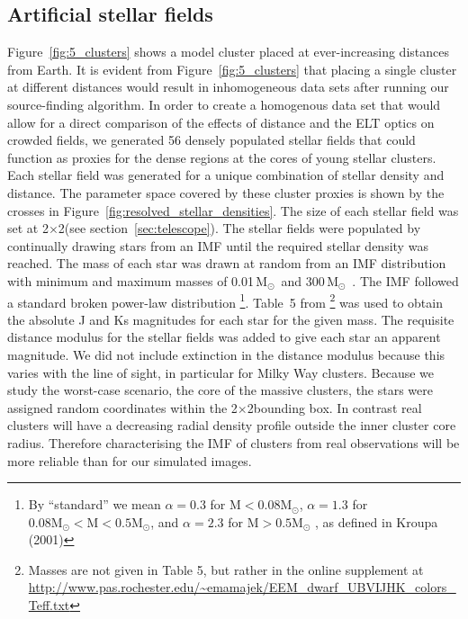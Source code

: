 \documentclass{aa}
\newcommand{\msun}{M$_\odot$~}
\begin{document}
\subsection{Artificial stellar fields}
  \label{subsec:stellar_fields}
Figure~\ref{fig:5_clusters} shows a model cluster placed at ever-increasing distances from Earth.
It is evident from Figure~\ref{fig:5_clusters} that placing a single cluster at different distances would result in inhomogeneous data sets after running our source-finding algorithm.
In order to create a homogenous data set that would allow for a direct comparison of the effects of distance and the ELT optics on crowded fields, we generated 56 densely populated stellar fields that could function as proxies for the dense regions at the cores of young stellar clusters.
Each stellar field was generated for a unique combination of stellar density and distance.
The parameter space covered by these cluster proxies is shown by the crosses in Figure~\ref{fig:resolved_stellar_densities}.
The size of each stellar field was set at 2\arcsec$\times$2\arcsec (see section~\ref{sec:telescope}).
The stellar fields were populated by continually drawing stars from an IMF until the required stellar density was reached.
The mass of each star was drawn at random from an IMF distribution with minimum and maximum masses of 0.01\,\msun and 300\,\msun.
The IMF followed a standard \citet{kroupa2001} broken power-law distribution
\footnote{By ``standard'' we mean $\alpha=0.3$ for $\mathrm{M} < 0.08 \mathrm{M}_\odot$, $\alpha=1.3$ for $0.08\mathrm{M}_\odot < \mathrm{M} < 0.5 \mathrm{M}_\odot$, and $\alpha=2.3$ for $\mathrm{M} > 0.5 \mathrm{M}_\odot$ , as defined in Kroupa (2001)}.
Table~5 from \citet{pecaut2013}\footnote{Masses are not given in Table 5, but rather in the online supplement at \url{http://www.pas.rochester.edu/~emamajek/EEM_dwarf_UBVIJHK_colors_Teff.txt}}
was used to obtain the absolute J and Ks magnitudes for each star for the given mass.
The requisite distance modulus for the stellar fields was added to give each star an apparent magnitude.
We did not include extinction in the distance modulus because this varies with the line of sight, in particular for Milky Way clusters.
Because we study the worst-case scenario, the core of the massive clusters, the stars were assigned random coordinates within the 2\arcsec$\times$2\arcsec bounding box.
In contrast real clusters will have a decreasing radial density profile outside the inner cluster core radius.
Therefore characterising the IMF of clusters from real observations will be more reliable than for our simulated images.
\end{document}
